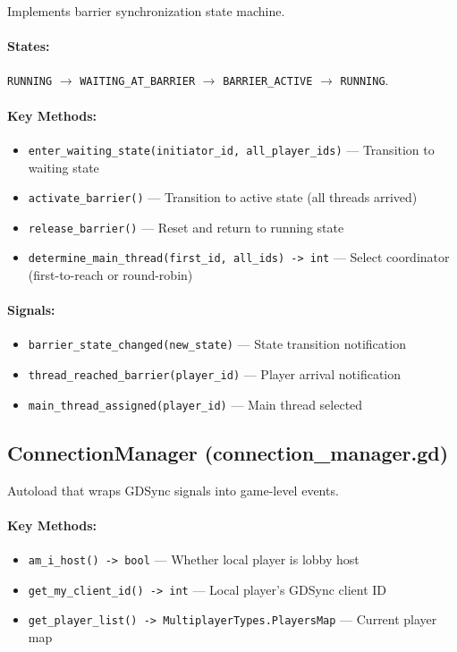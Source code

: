 Implements barrier synchronization state machine.

\paragraph*{States:} \texttt{RUNNING} $\to$ \texttt{WAITING\_AT\_BARRIER} $\to$ \texttt{BARRIER\_ACTIVE} $\to$ \texttt{RUNNING}.

\paragraph*{Key Methods:}
\begin{itemize}
    \item \texttt{enter\_waiting\_state(initiator\_id, all\_player\_ids)} --- Transition to waiting state
    \item \texttt{activate\_barrier()} --- Transition to active state (all threads arrived)
    \item \texttt{release\_barrier()} --- Reset and return to running state
    \item \texttt{determine\_main\_thread(first\_id, all\_ids) -> int} --- Select coordinator (first-to-reach or round-robin)
\end{itemize}

\paragraph*{Signals:}
\begin{itemize}
    \item \texttt{barrier\_state\_changed(new\_state)} --- State transition notification
    \item \texttt{thread\_reached\_barrier(player\_id)} --- Player arrival notification
    \item \texttt{main\_thread\_assigned(player\_id)} --- Main thread selected
\end{itemize}

\subsection{ConnectionManager (connection\_manager.gd)}
\label{app:c:connection-manager-class}

Autoload that wraps GDSync signals into game-level events.

\paragraph*{Key Methods:}
\begin{itemize}
    \item \texttt{am\_i\_host() -> bool} --- Whether local player is lobby host
    \item \texttt{get\_my\_client\_id() -> int} --- Local player's GDSync client ID
    \item \texttt{get\_player\_list() -> MultiplayerTypes.PlayersMap} --- Current player map
\end{itemize}

